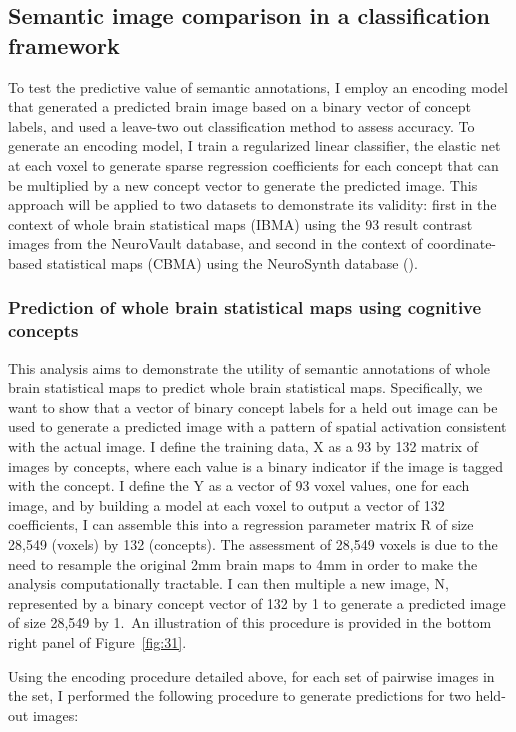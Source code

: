 \documentclass{report}
\begin{document}
\subsection{Semantic image comparison in a classification framework}
To test the predictive value of semantic annotations, I employ an
encoding model that generated a predicted brain image based on a binary
vector of concept labels, and used a leave-two out classification method
to assess accuracy. To generate an encoding model, I train a regularized
linear classifier, the elastic net
 \cite{noauthor_undated-wy} at
each voxel to generate sparse regression coefficients for each concept
that can be multiplied by a new concept vector to generate the predicted
image. This approach will be applied to two datasets to demonstrate its validity: first in the context of whole brain statistical maps (IBMA) using the 93 result contrast images from the NeuroVault database, and second in the context of coordinate-based statistical maps (CBMA) using the NeuroSynth database (\cite{Yarkoni2011-rg}).

\subsubsection{Prediction of whole brain statistical maps using cognitive concepts}
This analysis aims to demonstrate the utility of semantic annotations of whole brain statistical maps to predict whole brain statistical maps. Specifically, we want to show that a vector of binary concept labels for a held out image can be used to generate a predicted image with a pattern of spatial activation consistent with the actual image. I define the training data, X as a 93 by 132 matrix of images by
concepts, where each value is a binary indicator if the image is tagged
with the concept. I define the Y as a vector of 93 voxel values, one for
each image, and by building a model at each voxel to output a vector of
132 coefficients, I can assemble this into a regression parameter matrix
R of size 28,549 (voxels) by 132 (concepts). The assessment of 28,549
voxels is due to the need to resample the original 2mm brain maps to 4mm
in order to make the analysis computationally tractable. I can then
multiple a new image, N, represented by a binary concept vector of 132
by 1 to generate a predicted image of size 28,549 by 1.~An illustration
of this procedure is provided in the bottom right panel of Figure~\ref{fig:31}.

Using the encoding procedure detailed above, for each set of pairwise
images in the set, I performed the following procedure to generate
predictions for two held-out images: \newline
\end{document}
